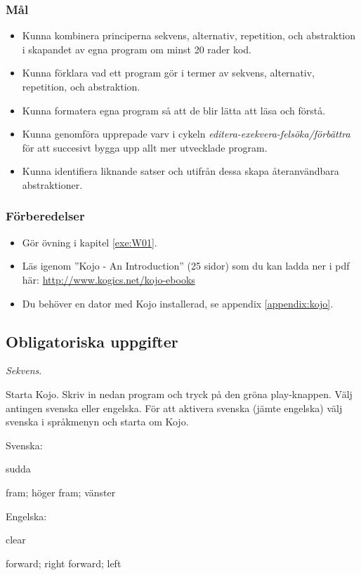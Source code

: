 
\Lab{\LabWeekONE}

\subsubsection{Mål}
\begin{itemize}[nosep]
\item Kunna kombinera principerna sekvens, alternativ, repetition, och abstraktion i skapandet av egna program om minst 20 rader kod.
\item Kunna förklara vad ett program gör i termer av sekvens, alternativ, repetition, och abstraktion.
\item Kunna formatera egna program så att de blir lätta att läsa och förstå.
\item Kunna genomföra upprepade varv i cykeln \emph{editera-exekvera-felsöka/förbättra} för att succesivt bygga upp allt mer utvecklade program. 
\item Kunna identifiera liknande satser och utifrån dessa skapa återanvändbara abstraktioner.
\end{itemize}

\subsubsection{Förberedelser}
\begin{itemize}[nosep]
\item Gör övning {\tt \ExeWeekONE} i kapitel \ref{exe:W01}.
\item Läs igenom ''Kojo - An Introduction'' (25 sidor) som du kan ladda ner i pdf  här: \href{http://www.kogics.net/kojo-ebooks}{http://www.kogics.net/kojo-ebooks}
\item Du behöver en dator med Kojo installerad, se appendix \ref{appendix:kojo}.
\end{itemize}

\subsection{Obligatoriska uppgifter}


\Task \textit{Sekvens}. 

\Subtask Starta Kojo. Skriv in nedan program och tryck på den gröna play-knappen. Välj antingen svenska eller engelska. För att aktivera svenska (jämte engelska) välj svenska i språkmenyn och starta om Kojo.

\begin{multicols}{2}
\noindent Svenska:
\begin{Code}
sudda

fram; höger
fram; vänster
\end{Code}

\columnbreak
\noindent Engelska:
\begin{Code}
clear

forward; right
forward; left
\end{Code}


\end{multicols}

